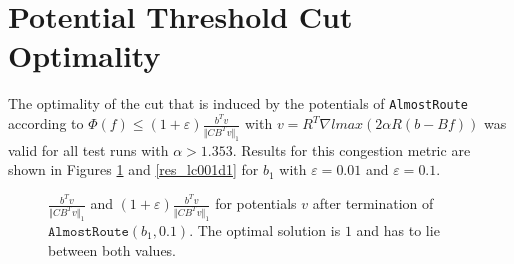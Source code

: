 \section{Potential Threshold Cut Optimality}
The optimality of the cut that is induced by the potentials of \texttt{AlmostRoute} according to $\Phi(f)\leq (1+\varepsilon)\frac{b^Tv}{\Vert CB^Tv\Vert_1} $ with $v=R^T\nabla lmax(2\alpha R(b-Bf))$ was valid for all test runs with $\alpha>1.353$. Results for this congestion metric are shown in Figures \ref{res_lc01d1} and \ref{res_lc001d1} for $b_1$ with $\varepsilon=0.01$ and $\varepsilon=0.1$.
\begin{figure}
\begin{center}
\end{center}
\caption{$\frac{b^Tv}{\Vert CB^Tv\Vert_1}$ and $(1+\varepsilon)\frac{b^Tv}{\Vert CB^Tv\Vert_1}$ for potentials $v$ after termination of $\texttt{AlmostRoute}(b_1,0.1)$. The optimal solution is $1$ and has to lie between both values.}\label{res_lc01d1}
\end{figure}
